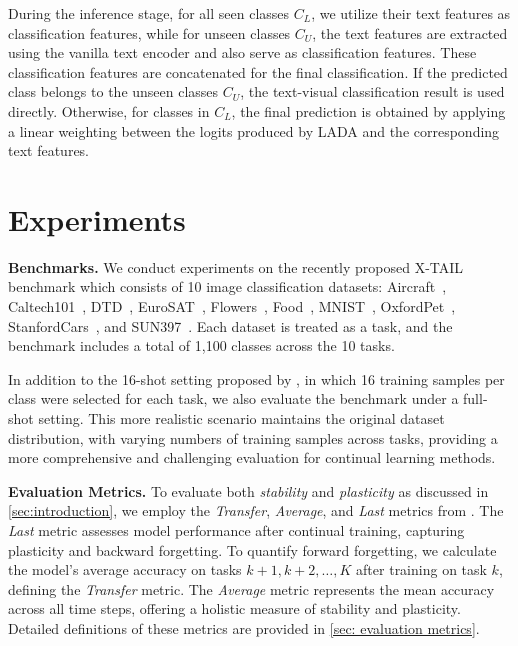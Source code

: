 \documentclass{article}
\theoremstyle{plain}
\theoremstyle{definition}
\theoremstyle{remark}
\begin{document}
During the inference stage, for all seen classes $C_L$, we utilize their text features as classification features, while for unseen classes $C_U$, the text features are extracted using the vanilla text encoder and also serve as classification features. These classification features are concatenated for the final classification. If the predicted class belongs to the unseen classes $C_U$, the text-visual classification result is used directly. Otherwise, for classes in $C_L$, the final prediction is obtained by applying a linear weighting between the logits produced by LADA and the corresponding text features.


\section{Experiments}
\textbf{Benchmarks.}
We conduct experiments on the recently proposed X-TAIL~\cite{xu2024advancing} benchmark which consists of 10 image classification datasets: Aircraft~\cite{maji2013fine}, Caltech101~\cite{fei2004learning}, DTD~\cite{cimpoi2014describing}, EuroSAT~\cite{helber2019eurosat}, Flowers~\cite{nilsback2008automated}, Food~\cite{bossard2014food}, MNIST~\cite{deng2012mnist}, OxfordPet~\cite{parkhi2012cats}, StanfordCars~\cite{krause20133d}, and SUN397~\cite{xiao2010sun}. Each dataset is treated as a task, and the benchmark includes a total of 1,100 classes across the 10 tasks.

In addition to the 16-shot setting proposed by \cite{xu2024advancing}, in which 16 training samples per class were selected for each task, we also evaluate the benchmark under a full-shot setting. This more realistic scenario maintains the original dataset distribution, with varying numbers of training samples across tasks, providing a more comprehensive and challenging evaluation for continual learning methods.


\textbf{Evaluation Metrics.} 
To evaluate both \emph{stability} and \emph{plasticity} as discussed in \cref{sec:introduction}, we employ the \emph{Transfer}, \emph{Average}, and \emph{Last} metrics from \citet{zheng2023preventing}. The \emph{Last} metric assesses model performance after continual training, capturing plasticity and backward forgetting. To quantify forward forgetting, we calculate the model's average accuracy on tasks $k+1, k+2, \dots, K$ after training on task $k$, defining the \emph{Transfer} metric. The \emph{Average} metric represents the mean accuracy across all time steps, offering a holistic measure of stability and plasticity. Detailed definitions of these metrics are provided in \cref{sec: evaluation metrics}.
\end{document}
